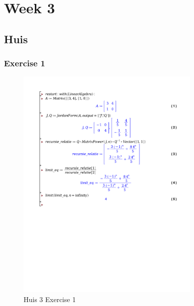 \documentclass[a4paper]{report}
\begin{document}
\section{Week 3}

\subsection{Huis}

\subsubsection{Exercise 1}

\begin{figure}[H]
	\centering
	\includegraphics[width=0.8\textwidth]{exercises/huis_3_ex_1.pdf}
	\caption{Huis 3 Exercise 1}
	\label{fig:huis_3_ex_1_Maple}
\end{figure}
\end{document}
